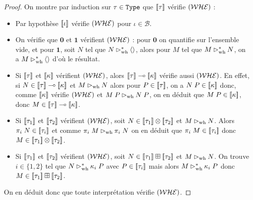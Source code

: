\begin{proof}
    On montre par induction sur $\tau\in\texttt{Type}$ que $[\![ \tau ]\!]$ vérifie $(\mathcal {WHE})$ :
    \begin{itemize}[label=$\bullet$]
        \item Par hypothèse $[\![ \iota ]\!]$ vérifie $(\mathcal {WHE})$ pour $\iota\in\mathcal B$.
        \item On vérifie que $\boldsymbol 0$ et $\boldsymbol 1$ vérifient $(\mathcal {WHE})$ : pour $\boldsymbol 0$ on quantifie sur l'ensemble vide, et pour $\boldsymbol 1$, soit $N$ tel que $N\rhd_{\mathrm{wh}}^*\langle\rangle$, alors pour $M$ tel que $M\rhd_{\mathrm{wh}}^* N$, on a $M\rhd_{\mathrm{wh}}^* \langle\rangle$ d'où le résultat.
        \item Si $[\![ \tau ]\!]$ et $[\![ \kappa ]\!]$ vérifient $(\mathcal {WHE})$, alors $[\![ \tau ]\!]\multimap[\![ \kappa ]\!]$ vérifie aussi $(\mathcal {WHE})$. En effet, si $N\in[\![ \tau ]\!]\multimap[\![ \kappa ]\!]$ et $M\rhd_{\mathrm{wh}} N$ alors pour $P\in [\![ \tau ]\!]$, on a $N\;P\in[\![ \kappa ]\!]$ donc, comme $[\![ \kappa ]\!]$ vérifie $(\mathcal {WHE})$ et $M\;P\rhd_{\mathrm{wh}} N\;P$, on en déduit que $M\;P\in[\![ \kappa ]\!]$, donc $M\in[\![ \tau ]\!]\multimap[\![ \kappa ]\!]$.
        \item Si $[\![ \tau_1 ]\!]$ et $[\![ \tau_2 ]\!]$ vérifient $(\mathcal {WHE})$, soit $N\in[\![ \tau_1 ]\!]\otimes[\![ \tau_2 ]\!]$ et $M\rhd_{\mathrm{wh}} N$. Alors $\pi_i\;N\in[\![ \tau_i ]\!]$ et comme $\pi_i\;M\rhd_{\mathrm{wh}}\pi_i\;N$ on en déduit que $\pi_i\;M\in[\![ \tau_i ]\!]$ donc $M\in[\![ \tau_1 ]\!]\otimes[\![ \tau_2 ]\!]$.
        \item Si $[\![ \tau_1 ]\!]$ et $[\![ \tau_2 ]\!]$ vérifient $(\mathcal {WHE})$, soit $N\in[\![ \tau_1 ]\!]\boxplus[\![ \tau_2 ]\!]$ et $M\rhd_{\mathrm{wh}} N$. On trouve $i\in\{1,2\}$ tel que $N\rhd_{\mathrm{wh}}^* \kappa_i\;P$ avec $P\in[\![ \tau_i ]\!]$ mais alors $M\rhd_{\mathrm{wh}}^* \kappa_i\;P$ donc $M\in[\![ \tau_1 ]\!]\boxplus[\![ \tau_2 ]\!]$.
    \end{itemize}
    On en déduit donc que toute interprétation vérifie $(\mathcal {WHE})$.


\end{proof}

